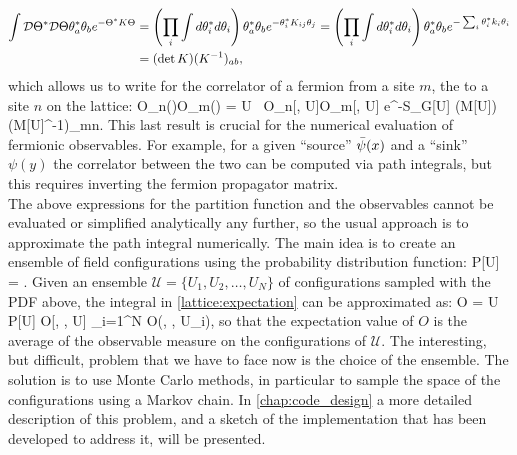 \begin{align}
    \int \mathcal{D}\Theta^*\mathcal{D}\Theta \theta_a^*\theta_b e^{-\Theta^* K \Theta } &= \left( \prod_i\int d\theta_i^*d\theta_i \right) \theta_a^*\theta_b e^{-\theta_i^* K_{ij} \theta_j } =  \left( \prod_i\int d\theta_i^*d\theta_i \right) \theta_a^*\theta_b e^{-\sum_i\theta_i^* k_i \theta_i } \\\nonumber
    &=  (\det K ) (K^{-1})_{ab},
\end{align}
which allows us to write for the correlator of a fermion from a site $m$, the  to a site $n$ on the lattice:
\beq
    \langle O_n(\psi)O_m(\bpsi) \rangle =   \int \D U ~O_n[\psi, U]O_m[\bpsi, U] e^{-S_G[U] } (\det M[U]) (M[U]^{-1})_{mn}.
    \label{lattice:fermioncorrelator}
\eeq
This last result is crucial for the numerical evaluation of fermionic observables. For example, for a given ``source'' $\bar{\psi}(x)$ and a ``sink'' $\psi(y)$ the correlator between the two can be computed via path integrals, but this requires inverting the fermion propagator matrix. \\
The above expressions for the partition function and the observables cannot be evaluated or simplified analytically any further, so the usual approach is to approximate the path integral numerically. The main idea is to create an ensemble of field configurations using the probability distribution function:
\beq
    P[U] = .
\eeq 
Given an ensemble $\mathcal{U} = \{ U_1, U_2, \dots,U_N \}$ of configurations sampled with the PDF above, the integral in \cref{lattice:expectation} can be approximated as:
\beq
\langle O \rangle =  \int \D U~ P[U] O[\psi, \bpsi, U] \approx {} \sum_{i=1}^N O(\psi, \bpsi, U_i), 
\eeq
so that the expectation value of $O$ is the average of the observable measure on the configurations of $\mathcal{U}$. The interesting, but difficult, problem that we have to face now is the choice of the ensemble. The solution is to use Monte Carlo methods, in particular to sample the space of the configurations using a Markov chain. In \cref{chap:code_design} a more detailed description of this problem, and a sketch of the implementation that has been developed to address it, will be presented.

